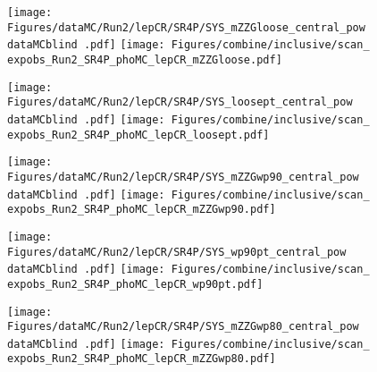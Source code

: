 \begin{figure}
  \centering
  \texttt{[image: Figures/dataMC/Run2/lepCR/SR4P/SYS\_mZZGloose\_central\_pow\\dataMCblind .pdf]}
  \hfill
  \texttt{[image: Figures/combine/inclusive/scan\_\\expobs\_Run2\_SR4P\_phoMC\_lepCR\_mZZGloose.pdf]}
  \caption{}
  \label{fig:scan_Run2_SR4P_phoMC_lepCR_mZZGloose}
\end{figure}

\begin{figure}
  \centering
  \texttt{[image: Figures/dataMC/Run2/lepCR/SR4P/SYS\_loosept\_central\_pow\\dataMCblind .pdf]}
  \hfill
  \texttt{[image: Figures/combine/inclusive/scan\_\\expobs\_Run2\_SR4P\_phoMC\_lepCR\_loosept.pdf]}
  \caption{}
  \label{fig:scan_Run2_SR4P_phoMC_lepCR_loosept}
\end{figure}

\begin{figure}
  \centering
  \texttt{[image: Figures/dataMC/Run2/lepCR/SR4P/SYS\_mZZGwp90\_central\_pow\\dataMCblind .pdf]}
  \hfill
  \texttt{[image: Figures/combine/inclusive/scan\_\\expobs\_Run2\_SR4P\_phoMC\_lepCR\_mZZGwp90.pdf]}
  \caption{}
  \label{fig:scan_Run2_SR4P_phoMC_lepCR_mZZGwp90}
\end{figure}

\begin{figure}
  \centering
  \texttt{[image: Figures/dataMC/Run2/lepCR/SR4P/SYS\_wp90pt\_central\_pow\\dataMCblind .pdf]}
  \hfill
  \texttt{[image: Figures/combine/inclusive/scan\_\\expobs\_Run2\_SR4P\_phoMC\_lepCR\_wp90pt.pdf]}
  \caption{}
  \label{fig:scan_Run2_SR4P_phoMC_lepCR_wp90pt}
\end{figure}

\begin{figure}
  \texttt{[image: Figures/dataMC/Run2/lepCR/SR4P/SYS\_mZZGwp80\_central\_pow\\dataMCblind .pdf]}
  \hfill
  \centering
  \texttt{[image: Figures/combine/inclusive/scan\_\\expobs\_Run2\_SR4P\_phoMC\_lepCR\_mZZGwp80.pdf]}
  \caption{}
  \label{fig:scan_Run2_SR4P_phoMC_lepCR_mZZGwp80}
\end{figure}

